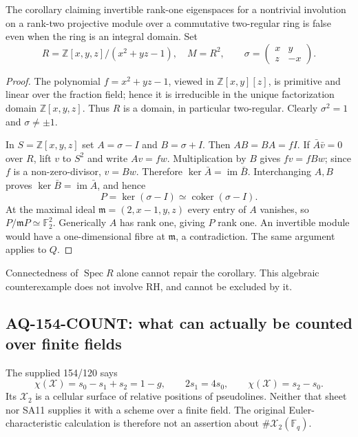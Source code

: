 The corollary claiming invertible rank-one eigenspaces
for a nontrivial involution on a rank-two projective
module over a commutative two-regular ring is false
even when the ring is an integral domain. Set
\[
 R=\mathbb Z[x,y,z]/(x^2+yz-1),\quad M=R^2,\qquad
 \sigma=\begin{pmatrix}x&y\\z&-x\end{pmatrix}.                   \tag{AQ.9}
\]
\begin{proof}
The polynomial $f=x^2+yz-1$, viewed in
$\mathbb Z[x,y][z]$, is primitive and linear over
the fraction field; hence it is irreducible in
the unique factorization domain $\mathbb Z[x,y,z]$.
Thus $R$ is a domain, in particular two-regular.
Clearly $\sigma^2=1$ and $\sigma\ne\pm1$.

In $S=\mathbb Z[x,y,z]$ set $A=\sigma-I$ and
$B=\sigma+I$. Then $AB=BA=fI$.
If $\bar A\bar v=0$ over $R$, lift $v$ to $S^2$
and write $Av=fw$. Multiplication by $B$ gives
$fv=fBw$; since $f$ is a non-zero-divisor,
$v=Bw$. Therefore $\ker\bar A=\operatorname{im}\bar B$.
Interchanging $A,B$ proves
$\ker\bar B=\operatorname{im}\bar A$, and hence
\[
 P=\ker(\sigma-I)\simeq\operatorname{coker}(\sigma-I).
\]
At the maximal ideal
$\mathfrak m=(2,x-1,y,z)$ every entry of $A$
vanishes, so
$P/\mathfrak mP\simeq\mathbb F_2^2$.
Generically $A$ has rank one, giving $P$ rank one.
An invertible module would have a one-dimensional
fibre at $\mathfrak m$, a contradiction.
The same argument applies to $Q$.
\end{proof}
Connectedness of $\operatorname{Spec}R$ alone cannot
repair the corollary. This algebraic counterexample
does not involve RH, and cannot be excluded by it.

\subsection{AQ-154-COUNT: what can actually be counted over finite fields}
The supplied 154/120 says
\[
 \chi(\mathcal X)=s_0-s_1+s_2=1-g,\qquad
 2s_1=4s_0,\qquad \chi(\mathcal X)=s_2-s_0.
\]
Its $\mathcal X_2$ is a cellular surface of relative
positions of pseudolines. Neither that sheet nor SA11
supplies it with a scheme over a finite field.
The original Euler-characteristic calculation is
therefore not an assertion about
$\#\mathcal X_2(\mathbb F_q)$.

